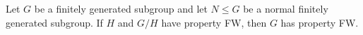 \begin{lem}
Let $G$ be a finitely generated subgroup and let $N\leq G$ be a normal finitely generated subgroup. If $H$ and $G/H$ have property FW, then $G$ has property FW.
\end{lem}
%
%
